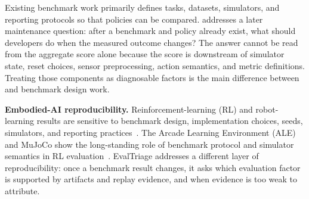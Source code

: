 Existing benchmark work primarily defines tasks, datasets, simulators, and reporting protocols so that policies can be compared. \sys addresses a later maintenance question: after a benchmark and policy already exist, what should developers do when the measured outcome changes? The answer cannot be read from the aggregate score alone because the score is downstream of simulator state, reset choices, sensor preprocessing, action semantics, and metric definitions. Treating those components as diagnosable factors is the main difference between \sys and benchmark design work.

\noindent\textbf{Embodied-AI reproducibility.}
Reinforcement-learning (RL) and robot-learning results are sensitive to benchmark design, implementation choices, seeds, simulators, and reporting practices~\cite{duan2016benchmarking,henderson2018drlmatters,engstrom2020implementation,pineau2021reproducibility,patterson2024empirical}. The Arcade Learning Environment (ALE) and MuJoCo show the long-standing role of benchmark protocol and simulator semantics in RL evaluation~\cite{machado2018ale,todorov2012mujoco}. EvalTriage addresses a different layer of reproducibility: once a benchmark result changes, it asks which evaluation factor is supported by artifacts and replay evidence, and when evidence is too weak to attribute.
